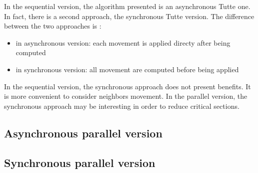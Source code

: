 
In the sequential version, the algorithm presented is an asynchronous Tutte one. In fact, there is a second approach, the synchronous Tutte version. The difference between the two approaches is :
\begin{itemize}
\item in asynchronous version: each movement is applied directy after being computed
\item in synchronous version: all movement are computed before being applied
\end{itemize}
In the sequential version, the synchronous approach does not present benefits. It is more convenient to consider neighbors movement.
In the parallel version, the synchronous approach may be interesting in order to reduce critical sections.
\subsection{Asynchronous parallel version}



\subsection{Synchronous parallel version}

